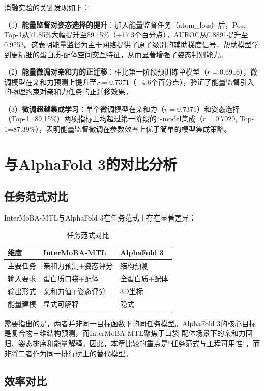 消融实验的关键发现如下：

（1）\textbf{能量监督对姿态选择的提升}：加入能量监督任务（atom\_loss）后，Pose Top-1从71.85\%大幅提升至89.15\%（+17.3个百分点），AUROC从0.8891提升至0.9253。这表明能量监督为主干网络提供了原子级别的辅助梯度信号，帮助模型学到更精细的蛋白质-配体空间交互特征，从而显著增强了姿态判别能力。

（2）\textbf{能量微调对亲和力的正迁移}：相比第一阶段预训练单模型（$r=0.6916$），微调模型在亲和力预测上提升至$r=0.7371$（+4.6个百分点），验证了能量监督引入的物理约束对亲和力任务的正迁移效果。

（3）\textbf{微调超越集成学习}：单个微调模型在亲和力（$r=0.7371$）和姿态选择（Top-1=89.15\%）两项指标上均超过第一阶段的4-model集成（$r=0.7020$, Top-1=87.39\%），表明能量监督微调在参数效率上优于简单的模型集成策略。

\newpage

\section{与AlphaFold 3的对比分析}
\subsection{任务范式对比}

InterMoBA-MTL与AlphaFold 3在任务范式上存在显著差异：

\begin{table}[htb]
  \centering
  \caption{任务范式对比}
  \label{T.paradigm_comparison}
  \begin{tabular}{lll}
  \hline
  维度 & InterMoBA-MTL & AlphaFold 3 \\
  \hline
  主要任务 & 亲和力预测+姿态评分 & 结构预测 \\
  输入要求 & 蛋白质口袋+配体 & 全蛋白质+配体 \\
  输出形式 & 亲和力值+姿态评分 & 3D坐标 \\
  能量建模 & 显式可解释 & 隐式 \\
  \hline
\end{tabular}
\end{table}

需要指出的是，两者并非同一目标函数下的同任务模型。AlphaFold 3的核心目标是复合物三维结构预测，而InterMoBA-MTL聚焦于口袋-配体场景下的亲和力回归、姿态排序和能量解释。因此，本章比较的重点是``任务范式与工程可用性''，而非将二者作为同一排行榜上的替代模型。

\subsection{效率对比}


